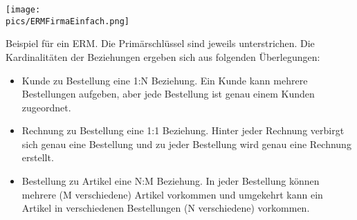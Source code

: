 \begin{minipage}{\textwidth}
	\centering\texttt{[image: \\pics/ERMFirmaEinfach.png]}
\end{minipage}

Beispiel für ein ERM. Die Primärschlüssel sind jeweils unterstrichen. Die Kardinalitäten der Beziehungen ergeben sich aus folgenden Überlegungen:
\begin{itemize}
	\item Kunde zu Bestellung eine 1:N Beziehung. Ein Kunde kann mehrere Bestellungen aufgeben, aber jede Bestellung ist genau einem Kunden zugeordnet.
	\item Rechnung zu Bestellung eine 1:1 Beziehung. Hinter jeder Rechnung verbirgt sich genau eine Bestellung und zu jeder Bestellung wird genau eine Rechnung erstellt.
	\item Bestellung zu Artikel eine N:M Beziehung. In jeder Bestellung können mehrere (M verschiedene) Artikel vorkommen und umgekehrt kann ein Artikel in verschiedenen Bestellungen (N verschiedene) vorkommen.
\end{itemize}
\begin{Exercise}[title=Vervollständige die ERMs aus Aufgabe \ref{ERMErstellen1}. Jeder Entitätstyp muss einen Primärschlüssel haben und ergänze die Kardinalitäten., label=ERMErstellen2]
	\phantom{ }
\end{Exercise}
